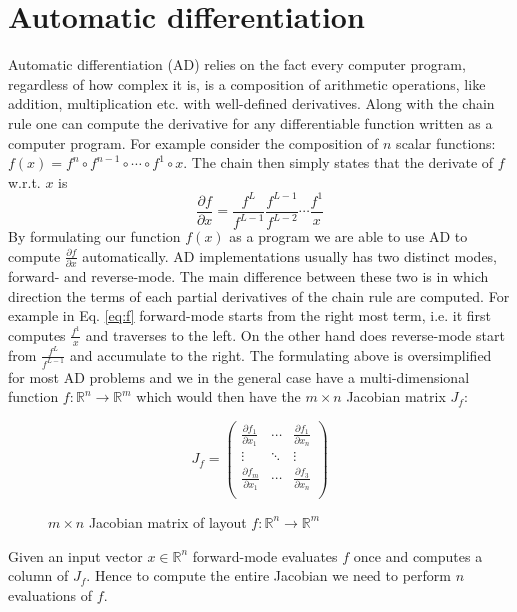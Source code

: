 \section{Automatic differentiation}
Automatic differentiation (AD) relies on the fact every computer program, regardless of how complex it is, 
is a composition of arithmetic operations, like addition, multiplication etc. with well-defined derivatives. 
Along with the chain rule one can compute the derivative for any differentiable function written as a computer program.  
For example consider the composition of $n$ scalar functions:
$f(x) = f^n \circ f^{n-1} \circ \cdots \circ f^1 \circ x$. The chain then simply states that the derivate of 
$f$ w.r.t. $x$ is 
\begin{equation}
\frac{\partial f}{\partial x} = \frac{f^L}{f^{L-1}} \frac{f^{L-1}}{f^{L-2}} \cdots \frac{f^1}{x}
\label{eq:f}
\end{equation}
By formulating our function $f(x)$ as a program we are able to use AD to compute $\frac{\partial f}{\partial x}$ automatically. 
AD implementations usually has two distinct modes, forward- and reverse-mode.
The main difference between these two is in which direction the terms of each partial derivatives of the chain rule
are computed. For example in Eq. \ref{eq:f} forward-mode starts from the right most term, i.e. it first computes $\frac{f^1}{x}$
and traverses to the left. On the other hand does reverse-mode start from $\frac{f^L}{f^{L-1}}$ and accumulate to the right. \newline 
The formulating above is oversimplified for most AD problems and we in the general case 
have a multi-dimensional function $f : \mathbb{R}^n \to \mathbb{R}^m$  which would then have the $m\times n$  Jacobian matrix $J_f$:
\begin{figure}[H]
	$$ J_{f} = \left(\begin{matrix}
	\frac{\partial f_1}{\partial x_1} & \cdots & \frac{\partial f_1}{\partial x_n} \\
    \vdots & \ddots & \vdots \\
	\frac{\partial f_m}{\partial x_1} & \cdots  &  \frac{\partial f_3}{\partial x_n}\\
	\end{matrix}\right) $$
	\caption{$m\times n$ Jacobian matrix of layout $f : \mathbb{R}^n \to \mathbb{R}^m$}
\end{figure}
Given an input vector $x \in \mathbb{R}^n$  forward-mode evaluates $f$ once and computes a column of $J_f$. 
Hence to compute the entire Jacobian we need to perform $n$ evaluations of $f$.  
